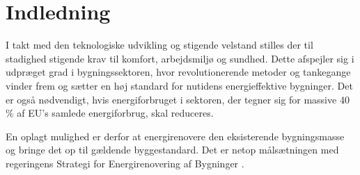 \chapter{Indledning}

I takt med den teknologiske udvikling og stigende velstand stilles der til stadighed stigende krav til komfort, arbejdsmiljø og sundhed. Dette afspejler sig i udpræget grad i bygningssektoren, hvor revolutionerende metoder og tankegange vinder frem og sætter en høj standard for nutidens energieffektive bygninger. Det er også nødvendigt, hvis energiforbruget i sektoren, der tegner sig for massive 40 \% af EU's samlede energiforbrug, skal reduceres. 

En oplagt mulighed er derfor at energirenovere den eksisterende bygningsmasse og bringe det op til gældende byggestandard. Det er netop målsætningen med regeringens Strategi for Energirenovering af Bygninger \citep{renostra}. 